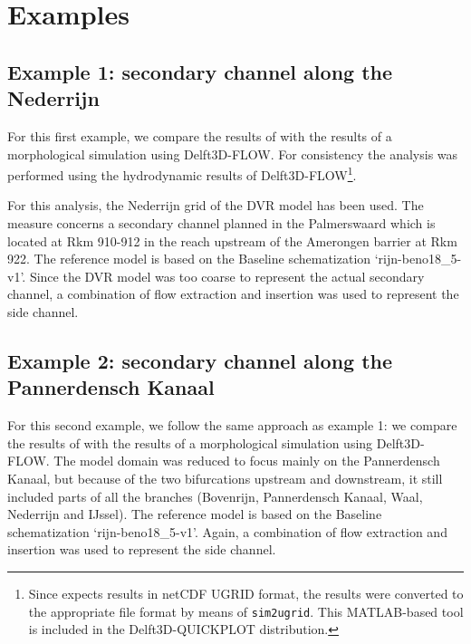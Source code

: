 \chapter{Examples}

\section{Example 1: secondary channel along the Nederrijn}

For this first example, we compare the results of \dfastmi with the results of a morphological simulation using Delft3D-FLOW.
For consistency the \dfastmi analysis was performed using the hydrodynamic results of Delft3D-FLOW\footnote{Since \dfastmi expects \dflowfm results in netCDF UGRID format, the results were converted to the appropriate file format by means of \texttt{sim2ugrid}.
This MATLAB-based tool is included in the Delft3D-QUICKPLOT distribution.}.

For this analysis, the Nederrijn grid of the DVR model has been used.
The measure concerns a secondary channel planned in the Palmerswaard which is located at Rkm 910-912 in the reach upstream of the Amerongen barrier at Rkm 922.
The reference model is based on the Baseline schematization ‘rijn-beno18\_5-v1’.
Since the DVR model was too coarse to represent the actual secondary channel, a combination of flow extraction and insertion was used to represent the side channel.


\section{Example 2: secondary channel along the Pannerdensch Kanaal}

For this second example, we follow the same approach as example 1: we compare the results of \dfastmi with the results of a morphological simulation using Delft3D-FLOW.
The model domain was reduced to focus mainly on the Pannerdensch Kanaal, but because of the two bifurcations upstream and downstream, it still included parts of all the branches (Bovenrijn, Pannerdensch Kanaal, Waal, Nederrijn and IJssel).
The reference model is based on the Baseline schematization ‘rijn-beno18\_5-v1’.
Again, a combination of flow extraction and insertion was used to represent the side channel.

